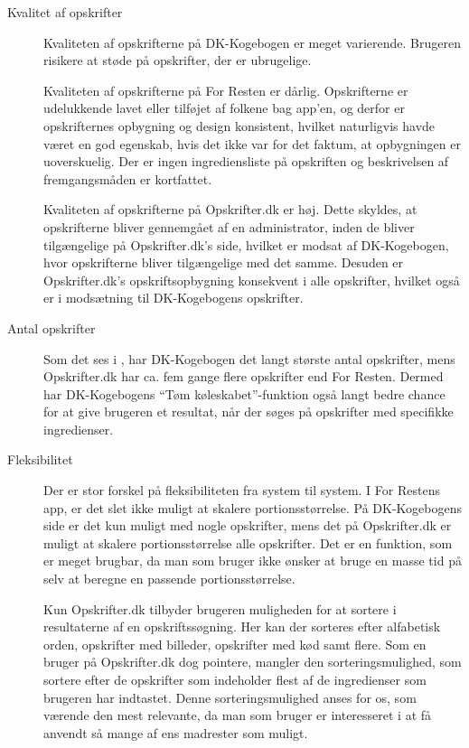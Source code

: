 \begin{description}
\item[Kvalitet af opskrifter]
Kvaliteten af opskrifterne på DK-Kogebogen er meget varierende. Brugeren risikere at støde på opskrifter, der er ubrugelige. 

Kvaliteten af opskrifterne på For Resten er dårlig. Opskrifterne er udelukkende lavet eller tilføjet af folkene bag app’en, og derfor er opskrifternes opbygning og design konsistent, hvilket naturligvis havde været en god egenskab, hvis det ikke var for det faktum, at opbygningen er uoverskuelig. Der er ingen ingrediensliste på opskriften og beskrivelsen af fremgangsmåden er kortfattet. 

Kvaliteten af opskrifterne på Opskrifter.dk er høj. Dette skyldes, at opskrifterne bliver gennemgået af en administrator, inden de bliver tilgængelige på Opskrifter.dk’s side, hvilket er modsat af DK-Kogebogen, hvor opskrifterne bliver tilgængelige med det samme. Desuden er Opskrifter.dk’s opskriftsopbygning konsekvent i alle opskrifter, hvilket også er i modsætning til DK-Kogebogens opskrifter.

\item[Antal opskrifter]
Som det ses i , har DK-Kogebogen det langt største antal opskrifter, mens Opskrifter.dk har ca. fem gange flere opskrifter end For Resten. Dermed har DK-Kogebogens ``Tøm køleskabet''-funktion også langt bedre chance for at give brugeren et resultat, når der søges på opskrifter med specifikke ingredienser.

\item[Fleksibilitet]
Der er stor forskel på fleksibiliteten fra system til system. I For Restens app, er det slet ikke muligt at skalere portionsstørrelse. På DK-Kogebogens side er det kun muligt med nogle opskrifter, mens det på Opskrifter.dk er muligt at skalere portionsstørrelse alle opskrifter. Det er en funktion, som er meget brugbar, da man som bruger ikke ønsker at bruge en masse tid på selv at beregne en passende portionsstørrelse.

Kun Opskrifter.dk tilbyder brugeren muligheden for at sortere i resultaterne af en opskriftssøgning. Her kan der sorteres efter alfabetisk orden, opskrifter med billeder, opskrifter med kød samt flere. Som en bruger på Opskrifter.dk dog pointere, mangler den sorteringsmulighed, som sortere efter de opskrifter som indeholder flest af de ingredienser som brugeren har indtastet. Denne sorteringsmulighed anses for os, som værende den mest relevante, da man som bruger er interesseret i at få anvendt så mange af ens madrester som muligt.


\end{description}
